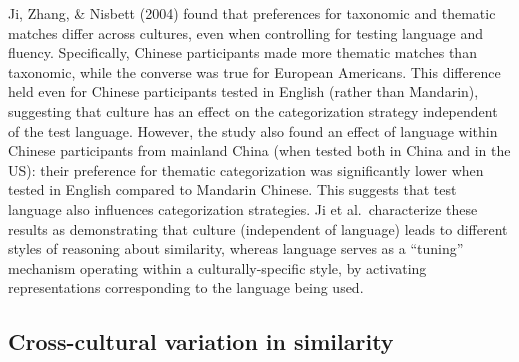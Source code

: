 \documentclass[10pt, letterpaper]{article}
\begin{document}
Ji, Zhang, \& Nisbett (2004) found that preferences for taxonomic and
thematic matches differ across cultures, even when controlling for
testing language and fluency. Specifically, Chinese participants made
more thematic matches than taxonomic, while the converse was true for
European Americans. This difference held even for Chinese participants
tested in English (rather than Mandarin), suggesting that culture has an
effect on the categorization strategy independent of the test language.
However, the study also found an effect of language within Chinese
participants from mainland China (when tested both in China and in the
US): their preference for thematic categorization was significantly
lower when tested in English compared to Mandarin Chinese. This suggests
that test language also influences categorization strategies. Ji et
al.~characterize these results as demonstrating that culture
(independent of language) leads to different styles of reasoning about
similarity, whereas language serves as a ``tuning'' mechanism operating
within a culturally-specific style, by activating representations
corresponding to the language being used.

\hypertarget{cross-cultural-variation-in-similarity}{%
\subsection{Cross-cultural variation in
similarity}\label{cross-cultural-variation-in-similarity}}
\end{document}
